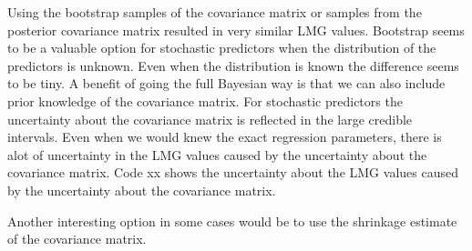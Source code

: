 \documentclass[11pt,a4paper,twoside]{book}
\begin{document}
Using the bootstrap samples of the covariance matrix or samples from the posterior covariance matrix resulted in very similar LMG values. Bootstrap seems to be a valuable option for stochastic predictors when the distribution of the predictors is unknown. Even when the distribution is known the difference seems to be tiny. A benefit of going the full Bayesian way is that we can also include prior knowledge of the covariance matrix. For stochastic predictors the uncertainty about the covariance matrix is reflected in the large credible intervals. Even when we would knew the exact regression parameters, there is alot of uncertainty in the LMG values caused by the uncertainty about the covariance matrix. Code xx shows the uncertainty about the LMG values caused by the uncertainty about the covariance matrix. 

Another interesting option in some cases would be to use the shrinkage estimate of the covariance matrix. 
\end{document}
